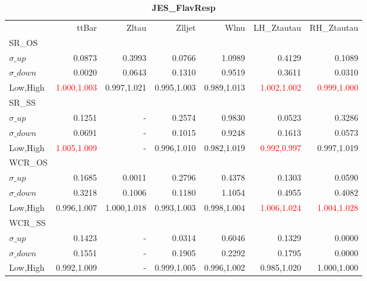 \documentclass[11pt,oneside,a4paper]{article}
\begin{document}
\begin{table}
\caption{\bf{JES\_FlavResp}}
\centering
\begin{tabular}{lrrrrrr}
& ttBar & Zltau & Zlljet & Wlnu & LH\_Ztautau & RH\_Ztautau \\

SR\_OS &  &  &  &  &  &  \\
$\sigma\_up$ & 0.0873 & 0.3993 & 0.0766 & 1.0989 & 0.4129 & 0.1089 \\
$\sigma\_down$ & 0.0020 & 0.0643 & 0.1310 & 0.9519 & 0.3611 & 0.0310 \\
Low,High & \textcolor{red}{1.000,1.003} & 0.997,1.021 & 0.995,1.003 & 0.989,1.013 & \textcolor{red}{1.002,1.002} & \textcolor{red}{0.999,1.000} \\

\hline
SR\_SS &  &  &  &  &  &  \\
$\sigma\_up$ & 0.1251 & - & 0.2574 & 0.9830 & 0.0523 & 0.3286 \\
$\sigma\_down$ & 0.0691 & - & 0.1015 & 0.9248 & 0.1613 & 0.0573 \\
Low,High & \textcolor{red}{1.005,1.009} & - & 0.996,1.010 & 0.982,1.019 & \textcolor{red}{0.992,0.997} & 0.997,1.019 \\

\hline
WCR\_OS &  &  &  &  &  &  \\
$\sigma\_up$ & 0.1685 & 0.0011 & 0.2796 & 0.4378 & 0.1303 & 0.0590 \\
$\sigma\_down$ & 0.3218 & 0.1006 & 0.1180 & 1.1054 & 0.4955 & 0.4082 \\
Low,High & 0.996,1.007 & 1.000,1.018 & 0.993,1.003 & 0.998,1.004 & \textcolor{red}{1.006,1.024} & \textcolor{red}{1.004,1.028} \\

\hline
WCR\_SS &  &  &  &  &  &  \\
$\sigma\_up$ & 0.1423 & - & 0.0314 & 0.6046 & 0.1329 & 0.0000 \\
$\sigma\_down$ & 0.1551 & - & 0.1905 & 0.2292 & 0.1795 & 0.0000 \\
Low,High & 0.992,1.009 & - & 0.999,1.005 & 0.996,1.002 & 0.985,1.020 & 1.000,1.000 \\

\end{tabular}
\end{table}
\end{document}
